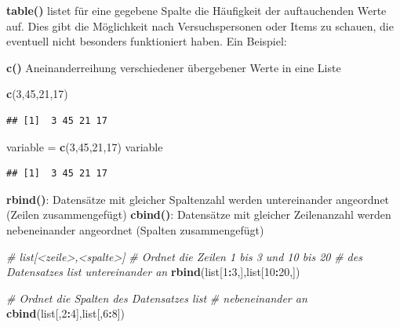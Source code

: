 \documentclass[]{book}
\newenvironment{Shaded}{\begin{snugshade}}{\end{snugshade}}
\newcommand{\KeywordTok}[1]{\textcolor[rgb]{0.13,0.29,0.53}{\textbf{#1}}}
\newcommand{\DecValTok}[1]{\textcolor[rgb]{0.00,0.00,0.81}{#1}}
\newcommand{\StringTok}[1]{\textcolor[rgb]{0.31,0.60,0.02}{#1}}
\newcommand{\CommentTok}[1]{\textcolor[rgb]{0.56,0.35,0.01}{\textit{#1}}}
\newcommand{\OperatorTok}[1]{\textcolor[rgb]{0.81,0.36,0.00}{\textbf{#1}}}
\newcommand{\NormalTok}[1]{#1}
\begin{document}
\textbf{table()} listet für eine gegebene Spalte die Häufigkeit der
auftauchenden Werte auf. Dies gibt die Möglichkeit nach Versuchspersonen
oder Items zu schauen, die eventuell nicht besonders funktioniert haben.
Ein Beispiel:

\begin{Shaded}
\end{Shaded}

\textbf{c()} Aneinanderreihung verschiedener übergebener Werte in eine
Liste

\begin{Shaded}
\begin{Highlighting}[]
\KeywordTok{c}\NormalTok{(}\DecValTok{3}\NormalTok{,}\DecValTok{45}\NormalTok{,}\DecValTok{21}\NormalTok{,}\DecValTok{17}\NormalTok{)}
\end{Highlighting}
\end{Shaded}

\begin{verbatim}
## [1]  3 45 21 17
\end{verbatim}

\begin{Shaded}
\begin{Highlighting}[]
\NormalTok{variable =}\StringTok{ }\KeywordTok{c}\NormalTok{(}\DecValTok{3}\NormalTok{,}\DecValTok{45}\NormalTok{,}\DecValTok{21}\NormalTok{,}\DecValTok{17}\NormalTok{)}
\NormalTok{variable}
\end{Highlighting}
\end{Shaded}

\begin{verbatim}
## [1]  3 45 21 17
\end{verbatim}

\textbf{rbind()}: Datensätze mit gleicher Spaltenzahl werden
untereinander angeordnet (Zeilen zusammengefügt) \textbf{cbind()}:
Datensätze mit gleicher Zeilenanzahl werden nebeneinander angeordnet
(Spalten zusammengefügt)

\begin{Shaded}
\begin{Highlighting}[]
\CommentTok{# list[<zeile>,<spalte>]}
\CommentTok{# Ordnet die Zeilen 1 bis 3 und 10 bis 20}
\CommentTok{# des Datensatzes list untereinander an}
\KeywordTok{rbind}\NormalTok{(list[}\DecValTok{1}\OperatorTok{:}\DecValTok{3}\NormalTok{,],list[}\DecValTok{10}\OperatorTok{:}\DecValTok{20}\NormalTok{,])}

\CommentTok{# Ordnet die Spalten des Datensatzes list }
\CommentTok{# nebeneinander an}
\KeywordTok{cbind}\NormalTok{(list[,}\DecValTok{2}\OperatorTok{:}\DecValTok{4}\NormalTok{],list[,}\DecValTok{6}\OperatorTok{:}\DecValTok{8}\NormalTok{])}
\end{Highlighting}
\end{Shaded}
\end{document}
